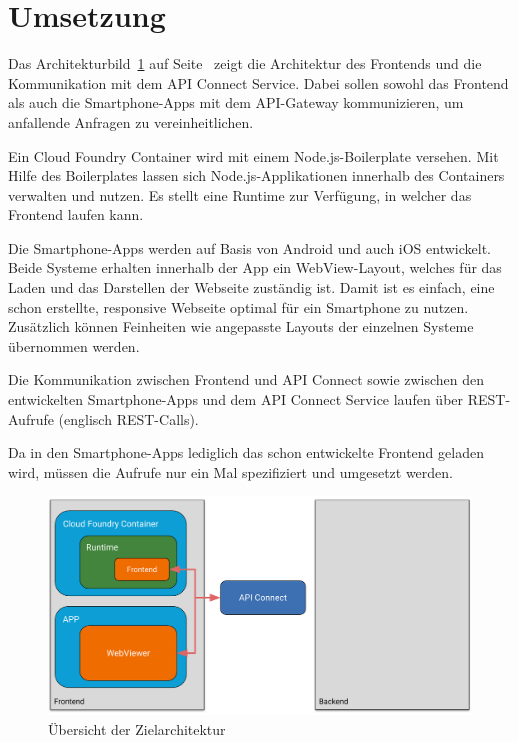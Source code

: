 \section{Umsetzung}
Das Architekturbild~\ref{fig:umsetzung_frontendarchitektur_4} auf Seite~\pageref{fig:umsetzung_frontendarchitektur_4}
zeigt die Architektur des Frontends und die Kommunikation mit dem API Connect Service. Dabei sollen sowohl das Frontend
als auch die Smartphone-Apps mit dem API-Gateway kommunizieren, um anfallende Anfragen zu vereinheitlichen.

Ein Cloud Foundry Container wird mit einem Node.js-Boilerplate versehen. Mit Hilfe des Boilerplates lassen sich
Node.js-Applikationen innerhalb des Containers verwalten und nutzen. Es stellt eine Runtime zur Verfügung, in welcher
das Frontend laufen kann.

Die Smartphone-Apps werden auf Basis von Android und auch iOS entwickelt. Beide Systeme erhalten innerhalb der App ein
WebView-Layout, welches für das Laden und das Darstellen der Webseite zuständig ist. Damit ist es einfach, eine schon
erstellte, responsive Webseite optimal für ein Smartphone zu nutzen. Zusätzlich können Feinheiten wie angepasste Layouts
der einzelnen Systeme übernommen werden.

Die Kommunikation zwischen Frontend und API Connect sowie zwischen den entwickelten Smartphone-Apps und dem API Connect
Service laufen über REST-Aufrufe (englisch REST-Calls).

Da in den Smartphone-Apps lediglich das schon entwickelte Frontend geladen wird, müssen die Aufrufe nur ein Mal
spezifiziert und umgesetzt werden.

\begin{figure}[h]
    \centering
    \includegraphics[width=\textwidth]{images/kapitel_4/architektur_frontend.pdf}
    \caption{Übersicht der Zielarchitektur}
    \label{fig:umsetzung_frontendarchitektur_4}
\end{figure}

